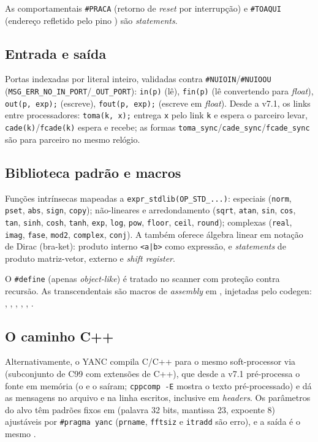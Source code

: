 As comportamentais \lstinline|#PRACA| (retorno de \emph{reset} por interrupção) e \lstinline|#TOAQUI| (endereço refletido pelo pino ) são \emph{statements}.

\subsection{Entrada e saída}

Portas indexadas por literal inteiro, validadas contra \lstinline|#NUIOIN|/\lstinline|#NUIOOU| (\lstinline|MSG_ERR_NO_IN_PORT|/\lstinline|_OUT_PORT|): \lstinline|in(p)| (lê), \lstinline|fin(p)| (lê convertendo para \emph{float}), \lstinline|out(p, exp);| (escreve), \lstinline|fout(p, exp);| (escreve em \emph{float}). Desde a v7.1, os links entre processadores: \lstinline|toma(k, x);| entrega \lstinline|x| pelo link \lstinline|k| e espera o parceiro levar, \lstinline|cade(k)|/\lstinline|fcade(k)| espera e recebe; as formas \lstinline|toma_sync|/\lstinline|cade_sync|/\lstinline|fcade_sync| são para parceiro no mesmo relógio.

\subsection{Biblioteca padrão e macros}

Funções intrínsecas mapeadas a \lstinline|expr_stdlib(OP_STD_...)|: especiais (\lstinline|norm|, \lstinline|pset|, \lstinline|abs|, \lstinline|sign|, \lstinline|copy|); não-lineares e arredondamento (\lstinline|sqrt|, \lstinline|atan|, \lstinline|sin|, \lstinline|cos|, \lstinline|tan|, \lstinline|sinh|, \lstinline|cosh|, \lstinline|tanh|, \lstinline|exp|, \lstinline|log|, \lstinline|pow|, \lstinline|floor|, \lstinline|ceil|, \lstinline|round|); complexas (\lstinline|real|, \lstinline|imag|, \lstinline|fase|, \lstinline|mod2|, \lstinline|complex|, \lstinline|conj|). A \cmm{} também oferece álgebra linear em notação de Dirac (bra-ket): produto interno \lstinline+<a|b>+ como expressão, e \emph{statements} de produto matriz-vetor, externo e \emph{shift register}.

O \lstinline|#define| (apenas \emph{object-like}) é tratado no scanner com proteção contra recursão. As transcendentais são macros de \emph{assembly} em , injetadas pelo codegen: , , , , , .

\subsection{O caminho C++}

Alternativamente, o YANC compila C/C++ para o mesmo soft-processor via  (subconjunto de C99 com extensões de C++), que desde a v7.1 pré-processa o fonte em memória (o  e o  saíram; \lstinline|cppcomp -E| mostra o texto pré-processado) e dá as mensagens no arquivo e na linha escritos, inclusive em \emph{headers}. Os parâmetros do alvo têm padrões fixos em  (palavra 32 bits, mantissa 23, expoente 8) ajustáveis por \lstinline|#pragma yanc| (\lstinline|prname|, \lstinline|fftsiz| e \lstinline|itradd| são erro), e a saída é o mesmo .
